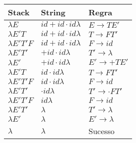 {        \begin{table}[htbp]
        \centering
        \begin{tabularx}{\linewidth}{ | l | >{\RaggedRight\arraybackslash}X |
                        >{\RaggedRight\arraybackslash}X |}
            \hline
            \textbf{Stack} & \textbf{String} & \textbf{Regra} \\
            \hline
            $\lambda E$ & $id + id \cdot id \lambda$ & $E \to TE'$ \\
           	\hline
            $\lambda E'T$ & $id + id \cdot id \lambda$ & $T \to FT'$ \\
            \hline
            $\lambda E'T'F$ & $id + id \cdot id \lambda$ & $F \to id$ \\
            \hline
            $\lambda E'T'$ & $+ id \cdot id \lambda$ & $T' \to \lambda$ \\
            \hline
            $\lambda E'$ & $+ id \cdot id \lambda$ & $E' \to +TE'$ \\
            \hline
            $\lambda E'T$ & $id \cdot id \lambda$ & $T \to FT'$ \\
            \hline
            $\lambda E'T'F$ & $id \cdot id \lambda$ & $F \to id$ \\
            \hline
            $\lambda E'T'$ & $\cdot id \lambda$ & $T' \to \cdot FT'$ \\
            \hline
            $\lambda E'T'F$ & $id \lambda$ & $F \to id$ \\
            \hline
            $\lambda E'T'$ & $\lambda$ & $T' \to \lambda$ \\
            \hline
            $\lambda E'$ & $\lambda$ & $E' \to \lambda$ \\
            \hline
            $\lambda$ & $\lambda$ & Sucesso \\
            \hline
        \end{tabularx}
    \end{table}

}


